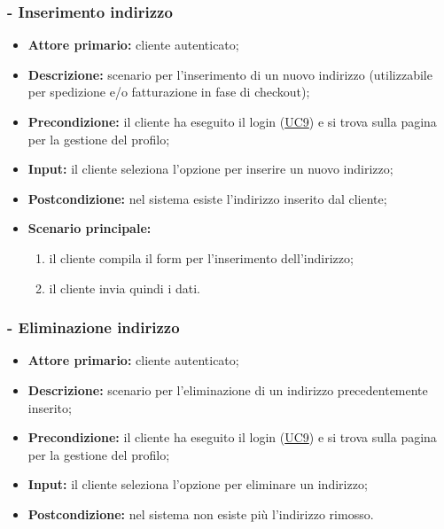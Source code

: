 \subsubsection{ - Inserimento indirizzo}
\begin{itemize}
    \item \textbf{Attore primario:} cliente autenticato;
    \item \textbf{Descrizione:} scenario per l'inserimento di un nuovo indirizzo (utilizzabile per spedizione e/o fatturazione in fase di checkout);
    \item \textbf{Precondizione:} il cliente ha eseguito il login (\hyperref[UC9]{UC9}) e si trova sulla pagina per la gestione del profilo;
    \item \textbf{Input:} il cliente seleziona l'opzione per inserire un nuovo indirizzo;
    \item \textbf{Postcondizione:} nel sistema esiste l'indirizzo inserito dal cliente;
    \item \textbf{Scenario principale:}
    \begin{enumerate}
        \item il cliente compila il form per l'inserimento dell'indirizzo;
        \item il cliente invia quindi i dati.
    \end{enumerate}
\end{itemize}

\stepsubUserCase
\subsubsection{ - Eliminazione indirizzo}
\begin{itemize}
    \item \textbf{Attore primario:} cliente autenticato;
    \item \textbf{Descrizione:} scenario per l'eliminazione di un indirizzo precedentemente inserito;
    \item \textbf{Precondizione:} il cliente ha eseguito il login (\hyperref[UC9]{UC9}) e si trova sulla pagina per la gestione del profilo;
    \item \textbf{Input:} il cliente seleziona l'opzione per eliminare un indirizzo;
    \item \textbf{Postcondizione:} nel sistema non esiste più l'indirizzo rimosso.
\end{itemize}

\stepsubUserCase
